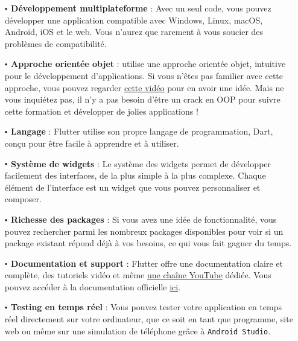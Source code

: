 \begin{itemize}

  \item[$\sbullet$] \textbf{Développement multiplateforme} : Avec un seul code, vous pouvez développer une application compatible avec Windows, Linux, macOS, Android, iOS et le web. Vous n'aurez que rarement à vous soucier des problèmes de compatibilité.\\

  \item[$\sbullet$] \textbf{Approche orientée objet} : \flutter{} utilise une approche orientée objet, intuitive pour le développement d'applications. Si vous n'êtes pas familier avec cette approche, vous pouvez regarder \href{https://www.youtube.com/watch?v=gABYMZbfGok&ab_channel=BandedeCodeurs}{cette vidéo} pour en avoir une idée. Mais ne vous inquiétez pas, il n'y a pas besoin d'être un crack en OOP pour suivre cette formation et développer de jolies applications !\\

  \item[$\sbullet$] \textbf{Langage \dart{}} : Flutter utilise son propre langage de programmation, Dart, conçu pour être facile à apprendre et à utiliser.\\

  \item[$\sbullet$] \textbf{Système de widgets} : Le système des widgets permet de développer facilement des interfaces, de la plus simple à la plus complexe. Chaque élément de l'interface est un widget que vous pouvez personnaliser et composer.\\

  \item[$\sbullet$] \textbf{Richesse des packages} : Si vous avez une idée de fonctionnalité, vous pouvez rechercher parmi les nombreux packages disponibles pour voir si un package existant répond déjà à vos besoins, ce qui vous fait gagner du temps.\\

  \item[$\sbullet$] \textbf{Documentation et support} : Flutter offre une documentation claire et complète, des tutoriels vidéo et même \href{https://www.youtube.com/@flutterdev/videos}{une chaîne YouTube} dédiée. Vous pouvez accéder à la documentation officielle \href{https://flutter.dev/docs}{ici}.\\

  \item[$\sbullet$] \textbf{Testing en temps réel} : Vous pouvez tester votre application en temps réel directement sur votre ordinateur, que ce soit en tant que programme, site web ou même sur une simulation de téléphone grâce à \texttt{Android Studio}.\\


\end{itemize}
